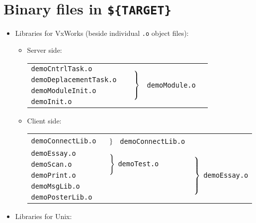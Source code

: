 \vfill\eject
\section{Binary files in {\tt \$\{TARGET\}}}

\begin{itemize}
\item Libraries for VxWorks (beside individual {\tt .o} object files):

	\begin{itemize}
	\item Server side:

		\vspace{.3cm}
		{\small
		\begin{tabular}{lll}
		\cline{1-1}
		\tt demoCntrlTask.o	& 
			\multirow{4}{3cm}{\
			$\left.{\vrule width 0pt height .9cm} \right\}$ \
			\tt demoModule.o} \\
		\tt demoDeplacementTask.o \\
		\tt demoModuleInit.o	\\
		\tt demoInit.o		\\
		\cline{1-1}
		\end{tabular}
		}
		\vspace{.3cm}

	\item Client side:

		\vspace{.3cm}
		{\small
		\begin{tabular}{lll}
		\cline{1-1}
		\tt demoConnectLib.o  
		    & 	\multirow{1}{3.5cm}{%
		      	$\left.{\vrule width 0pt} \right\}$
		      	\tt ~demoConnectLib.o}  \\
		\cline{1-2}
		\tt demoEssay.o
		    &	\multirow{3}{2.5cm}{
			$\left.{\vrule width 0pt height .64cm} \right\}$
			\tt demoTest.o}
			&   \multirow{5}{3cm}{
			    $\left.{\vrule width 0pt height 1.1cm} \right\}$
			    \tt demoEssay.o} \\
		\tt demoScan.o		\\
		\tt demoPrint.o		\\
		\cline{1-1}
		\tt demoMsgLib.o	\\
		\tt demoPosterLib.o	\\
		\cline{1-2}
		\end{tabular}
		}
	\end{itemize}
\vspace{.5cm}

\item Libraries for Unix:


\end{itemize}
